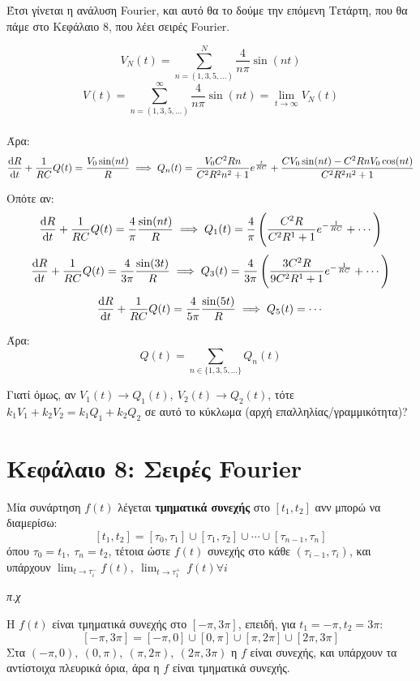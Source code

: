 \documentclass[11pt,a4paper,titlepage,final]{article}
\begin{document}
Έτσι γίνεται η ανάλυση \textlatin{Fourier}, και αυτό θα το δούμε την επόμενη Τετάρτη, που θα πάμε στο Κεφάλαιο 8, που λέει σειρές \textlatin{Fourier}.

\[
V_N(t) = \sum _{n = (1,3,5,\dots)}^N \frac{4}{n \pi} \sin (n t)
\]
\[
V(t) = \sum _{n = (1,3,5,\dots)}^\infty \frac{4}{n \pi} \sin (n t) = \lim_{t \to \infty} V_N(t)
\]

\paragraph{}
Άρα:
\[
 \frac{\dif R}{\dif t}  + \frac{1}{RC}Q(t) = \frac{V_0 \sin (nt)}{R} \implies
 Q_n(t) = \frac{V_0C^2Rn}{C^2R^2n^2+1}e^{\frac{t}{RC}} + \frac{CV_0\sin (nt) - C^2RnV_0 \cos (nt)}{C^2R^2n^2+1}
\]

Οπότε αν:
\[
 \frac{\dif R}{\dif t}  + \frac{1}{RC}Q(t) = \frac{4}{\pi} \frac{\sin (nt)}{R} \implies
 Q_1(t) = \frac{4}{\pi} \left( \frac{C^2R}{C^2R^1+1} e^{-\frac{1}{RC}}+ \cdots \right)
\]
\[
 \frac{\dif R}{\dif t}  + \frac{1}{RC}Q(t) = \frac{4}{3\pi} \frac{\sin (3t)}{R} \implies
 Q_3(t) = \frac{4}{3\pi} \left( \frac{3C^2R}{9C^2R^1+1} e^{-\frac{1}{RC}}+ \cdots \right)
\]
\[
 \frac{\dif R}{\dif t}  + \frac{1}{RC}Q(t) = \frac{4}{5\pi} \frac{\sin (5t)}{R} \implies
 Q_5(t) = \cdots
\]

Άρα:
\[
Q(t) = \sum_{n \in \lbrace1,3,5,\dots\rbrace}Q_n(t)
\]

Γιατί όμως, αν \(V_1(t) \rightarrow Q_1(t), \ V_2(t) \rightarrow Q_2(t)\), τότε \(k_1V_1+k_2V_2 = k_1Q_1 +k_2Q_2\) σε αυτό το κύκλωμα (αρχή επαλληλίας/γραμμικότητα)?


\section{Κεφάλαιο 8: Σειρές Fourier}

\begin{defn*}{}
Μία συνάρτηση \(f(t)\) λέγεται \textbf{τμηματικά συνεχής} στο \([t_1,t_2]\) ανν μπορώ να διαμερίσω:
\[ [t_1,t_2] = [\tau_0,\tau_1] \cup [\tau_1,\tau_2] \cup \cdots \cup [\tau_{n-1},\tau_n] \]
όπου \(\tau_0 = t_1,\ \tau_n = t_2\), τέτοια ώστε \(f(t)\) συνεχής στο κάθε \((\tau_{i-1},\tau_i)\), και υπάρχουν \(\lim_{t \to \tau_i^-} f(t),\ \lim_{t \to \tau_1^+}\ f(t) \forall i\)
\end{defn*}

\textit{π.χ}

Η \(f(t)\) είναι τμηματικά συνεχής στο \([-\pi,3\pi]\), επειδή, για \(t_1=-\pi,t_2=3\pi\):
\[
[-\pi,3\pi] = [-\pi,0] \cup [0,\pi] \cup [\pi,2\pi] \cup [2\pi,3\pi]
\]
Στα \( (-\pi,0),\ (0,\pi) ,\   (\pi,2\pi) ,\   (2\pi,3\pi)\) η \(f\) είναι συνεχής, και υπάρχουν τα αντίστοιχα πλευρικά όρια, %
άρα η \(f\) είναι τμηματικά συνεχής.
\end{document}
